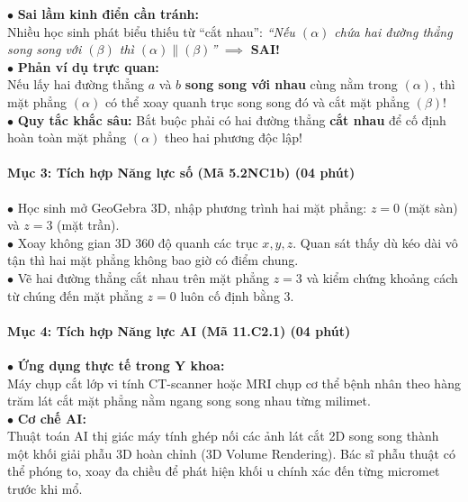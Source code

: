 \documentclass[12pt, a4paper]{article}
\begin{document}
\begin{scaffoldbox}
    $\bullet$ \textbf{Sai lầm kinh điển cần tránh:}\\
    Nhiều học sinh phát biểu thiếu từ ``cắt nhau'': \textit{``Nếu $(\alpha)$ chứa hai đường thẳng song song với $(\beta)$ thì $(\alpha) \parallel (\beta)$''} $\implies$ \textbf{SAI!}\\
    $\bullet$ \textbf{Phản ví dụ trực quan:}\\
    Nếu lấy hai đường thẳng $a$ và $b$ \textbf{song song với nhau} cùng nằm trong $(\alpha)$, thì mặt phẳng $(\alpha)$ có thể xoay quanh trục song song đó và cắt mặt phẳng $(\beta)$!\\
    $\bullet$ \textbf{Quy tắc khắc sâu:} Bắt buộc phải có hai đường thẳng \textbf{cắt nhau} để cố định hoàn toàn mặt phẳng $(\alpha)$ theo hai phương độc lập!
\end{scaffoldbox}

\paragraph{Mục 3: Tích hợp Năng lực số (Mã 5.2NC1b) (04 phút)}

\begin{pedabox}
    $\bullet$ Học sinh mở GeoGebra 3D, nhập phương trình hai mặt phẳng: $z = 0$ (mặt sàn) và $z = 3$ (mặt trần).\\
    $\bullet$ Xoay không gian 3D 360 độ quanh các trục $x, y, z$. Quan sát thấy dù kéo dài vô tận thì hai mặt phẳng không bao giờ có điểm chung.\\
    $\bullet$ Vẽ hai đường thẳng cắt nhau trên mặt phẳng $z = 3$ và kiểm chứng khoảng cách từ chúng đến mặt phẳng $z = 0$ luôn cố định bằng $3$.
\end{pedabox}

\paragraph{Mục 4: Tích hợp Năng lực AI (Mã 11.C2.1) (04 phút)}

\begin{aibox}
    $\bullet$ \textbf{Ứng dụng thực tế trong Y khoa:}\\
    Máy chụp cắt lớp vi tính CT-scanner hoặc MRI chụp cơ thể bệnh nhân theo hàng trăm lát cắt mặt phẳng nằm ngang song song nhau từng milimet.\\
    $\bullet$ \textbf{Cơ chế AI:}\\
    Thuật toán AI thị giác máy tính ghép nối các ảnh lát cắt 2D song song thành một khối giải phẫu 3D hoàn chỉnh (3D Volume Rendering). Bác sĩ phẫu thuật có thể phóng to, xoay đa chiều để phát hiện khối u chính xác đến từng micromet trước khi mổ.
\end{aibox}
\end{document}
